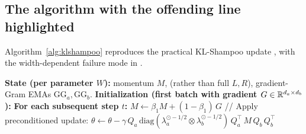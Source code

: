 \subsection{The algorithm with the offending line highlighted}

Algorithm~\ref{alg:klshampoo} reproduces the practical KL-Shampoo update
\citep[Box ``Practical KL-Shampoo'']{lin2025klshampoo}, with the
width-dependent failure mode in .

\begin{algorithm}[t]
\caption{KL-Shampoo update for a weight matrix $W\in\R^{d_a\times d_b}$.
 lines mark the modifications vs Shampoo$^2$
(Algorithm~\ref{alg:shampoo}); the  line is the source of
imperfect width transfer.}
\label{alg:klshampoo}
\begin{algorithmic}[1]
  \Statex \textbf{State (per parameter $W$):} momentum $M$,  (rather than full
          $L,R$), gradient-Gram EMAs $\mathrm{GG}_a,\mathrm{GG}_b$.
  \Statex
  \State \textbf{Initialization (first batch with gradient $G\in\mathbb{R}^{d_a\times d_b}$):}
  \State {}
  \State {}
  \State {}
  \Statex
  \State \textbf{For each subsequent step $t$:}
  \State \quad $M \gets \beta_1 M + (1-\beta_1)\,G$
  \Statex \quad {}
  \State \quad {}
  \State \quad {}
  \State \quad {}
  \Statex \quad {}
  \State \quad {}
  \Statex \quad // Apply preconditioned update:
  \State \quad $\theta \gets \theta - \gamma\,
                Q_a\,\mathrm{diag}(\lambda_a^{\odot -1/2}\otimes\lambda_b^{\odot -1/2})\,Q_a^\top\,M\,Q_b\,Q_b^\top$
\end{algorithmic}
\end{algorithm}

